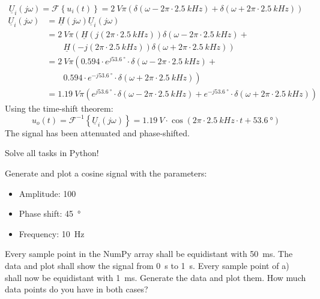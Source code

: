 \begin{solution}
\begin{tasks}
		\task
		\begin{equation*}
			\underline{U}_i\left(j \omega\right) = \mathcal{F}\left\{u_i(t)\right\} = \SI{2}{V} \pi \left(\delta\left(\omega - 2 \pi \cdot \SI{2.5}{kHz}\right) + \delta\left(\omega + 2 \pi \cdot \SI{2.5}{kHz}\right)\right)
		\end{equation*}
		\begin{equation*}
			\begin{split}
				\underline{U}_i\left(j \omega\right) &= \underline{H}\left(j \omega\right) \underline{U}_i\left(j \omega\right) \\
				 &= \SI{2}{V} \pi \left(\underline{H}\left(j \left(2 \pi \cdot \SI{2.5}{kHz}\right)\right) \delta\left(\omega - 2 \pi \cdot \SI{2.5}{kHz}\right) \right. + \\ &\qquad \left. \underline{H}\left(-j \left(2 \pi \cdot \SI{2.5}{kHz}\right)\right) \delta\left(\omega + 2 \pi \cdot \SI{2.5}{kHz}\right)\right) \\
				 &= \SI{2}{V} \pi \left(0.594 \cdot e^{j \SI{53.6}{\degree}} \cdot \delta\left(\omega - 2 \pi \cdot \SI{2.5}{kHz}\right) \right. + \\ &\qquad \left. 0.594 \cdot e^{-j \SI{53.6}{\degree}} \cdot \delta\left(\omega + 2 \pi \cdot \SI{2.5}{kHz}\right)\right) \\
				 &= \SI{1.19}{V} \pi \left(e^{j \SI{53.6}{\degree}} \cdot \delta\left(\omega - 2 \pi \cdot \SI{2.5}{kHz}\right) + e^{-j \SI{53.6}{\degree}} \cdot \delta\left(\omega + 2 \pi \cdot \SI{2.5}{kHz}\right)\right)
			\end{split}
		\end{equation*}
		Using the time-shift theorem:
		\begin{equation*}
			u_o(t) = \mathcal{F}^{-1}\left\{\underline{U}_i\left(j \omega\right)\right\} = \SI{1.19}{V} \cdot \cos\left(2 \pi \cdot \SI{2.5}{kHz} \cdot t + \SI{53.6}{\degree}\right)
		\end{equation*}
		The signal has been attenuated and phase-shifted.
	\end{tasks}
\end{solution}

\begin{question}[subtitle={Python Programming: Sinusoidal Signals}]
	Solve all tasks in Python!
	\begin{tasks}
		\task
		Generate and plot a cosine signal with the parameters:
		\begin{itemize}
			\item Amplitude: 100
			\item Phase shift: \SI{45}{\degree}
			\item Frequency: \SI{10}{Hz}
		\end{itemize}
		Every sample point in the NumPy array shall be equidistant with \SI{50}{ms}. The data and plot shall show the signal from \SI{0}{s} to \SI{1}{s}.
		\task
		Every sample point of a) shall now be equidistant with \SI{1}{ms}. Generate the data and plot them.
		\task How much data points do you have in both cases?
	\end{tasks}
\end{question}

